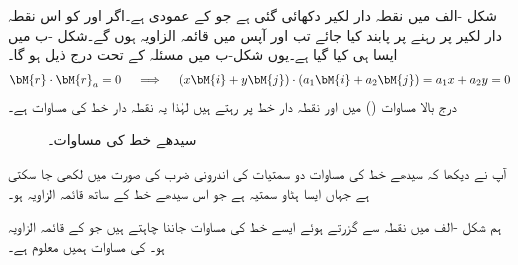 شکل -الف میں نقطہ دار لکیر دکھائی گئی ہے جو  کے عمودی ہے۔اگر  اور  کو اس نقطہ دار لکیر پر رہنے پر پابند کیا جائے تب  اور  آپس میں قائمہ الزاویہ ہوں گے۔شکل -ب میں ایسا ہی کیا گیا ہے۔یوں شکل-ب میں مسئلہ  کے تحت درج ذیل ہو گا۔
\begin{align}\label{مساوات_الجبرا_سیدھا_خط_اندرونی_ضرب_الف}
\bM{r}\cdot \bM{r}_a=0\quad \implies \quad  (x\bM{i}+y\bM{j})\cdot(a_1\bM{i}+a_2\bM{j})=a_1x+a_2y=0
\end{align}
 درج بالا مساوات () میں  اور  نقطہ دار خط پر رہتے ہیں لہٰذا یہ نقطہ دار خط کی مساوات ہے۔
\begin{figure}
\centering
\begin{subfigure}{0.45\textwidth}
\centering
{}
\caption{}
\end{subfigure}\hfill
\begin{subfigure}{0.45\textwidth}
\centering
{}
\caption{}
\end{subfigure}
\caption{سیدھے خط کی مساوات۔}
\label{شکل_سیدھے_خط_کی_عمومی_مساوات}
\end{figure}

آپ نے دیکھا کہ سیدھے خط کی مساوات دو سمتیات کی اندرونی ضرب  کی صورت میں لکھی جا سکتی ہے جہاں  ایسا ہٹاو سمتیہ ہے جو اس سیدھے خط کے ساتھ قائمہ الزاویہ ہو۔

 ہم شکل -الف میں نقطہ  سے گزرتے ہوئے ایسے خط  کی مساوات جاننا چاہتے ہیں جو  کے  قائمہ الزاویہ ہو۔ کی مساوات ہمیں معلوم  ہے۔

